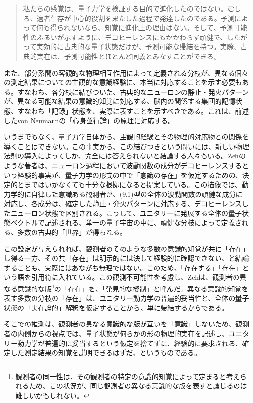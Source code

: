 \hypertarget{srcpage:376}{}\label{srcpage:376}
\begin{quote}
私たちの感覚は、量子力学を検証する目的で進化したのではない。むしろ、適者生存が中心的役割を果たした過程で発達したのである。予測によって何も得られないなら、知覚に進化上の理由はない。そして、予測可能性のふるいが示すように、デコヒーレンスにもかかわらず頑健で、したがって実効的に古典的な量子状態だけが、予測可能な帰結を持つ。実際、古典的実在は、予測可能性とほとんど同義とみなすことができる。
\end{quote}
また、部分系間の客観的な物理相互作用によって定義される分枝が、異なる個々の測定結果についての主観的な意識経験に、本当に対応することを示す必要もある。すなわち、各分枝に結びついた、古典的なニューロンの静止・発火パターンが、異なる可能な結果の意識的知覚に対応する、脳内の関係する集団的記憶状態、すなわち「記録」状態を、実際に表すことを示すべきである。これは、前述したvon Neumannの「心身並行論」の原理\cite{ref060}に対応する。

いうまでもなく、量子力学自体から、主観的経験とその物理的対応物との関係を導くことはできない。この事実から、この結びつきという問いには、新しい物理法則の導入によってしか、完全には答えられないと結論する人々もいる\cite{ref504}。Zeh\cite{ref039,ref523}のような著者は、ニューロン過程において波動関数の成分がデコヒーレンスするという経験的事実が、量子力学の形式の中で「意識の存在」を仮定するための、決定的とまではいかなくても十分な根拠になると提案している。この描像では、動力学的に自律した意識ある観測者が、(9.1)型の全体の波動関数の頑健な成分に対応し、各成分は、確定した静止・発火パターンに対応する、デコヒーレンスしたニューロン状態で区別される。こうして、ユニタリーに発展する全体の量子状態ベクトルで記述される、単一の量子宇宙の中に、頑健な分枝によって定義される、多数の古典的「世界」が得られる。

この設定が与えられれば、観測者のそのような多数の意識的知覚が共に「存在」し得る一方、その共「存在」は明示的には決して経験的に確認できない、と結論することも、実際にはあながち無理ではない。このため、「存在する」「存在」という語を引用符に入れている。この観測不可能性を考慮し、Zehは、観測者の異なる意識的な版\footnote{観測者の同一性は、その観測者の特定の意識的知覚によって定まると考えられるため、この状況が、同じ観測者の異なる意識的な版を表すと論じるのは難しいかもしれない。}の「存在」を、「発見的な擬制」\cite{ref523}と呼んだ。異なる意識的知覚を表す多数の分枝の「存在」は、ユニタリー動力学の普遍的妥当性と、全体の量子状態の「実在論的」解釈を仮定することから、単に帰結するからである。


\hypertarget{srcpage:377}{}\label{srcpage:377}
そこでの推測は、観測者の異なる意識的な版が互いを「意識」しないため、観測者の内側からの視点では、量子状態が何らかの形の物理的実在を記述し、ユニタリー動力学が普遍的に妥当するという仮定を捨てずに、経験的に要求される、確定した測定結果の知覚を説明できるはずだ、というものである。

